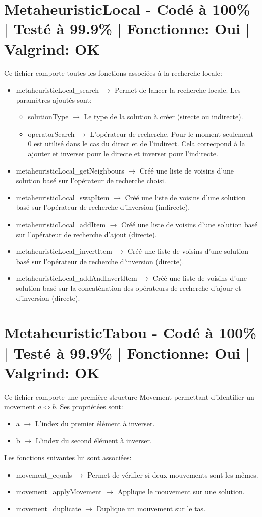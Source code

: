 \documentclass{EPUProjetPeiP}
\newcommand{\comp}[5]{
	\section[#1]{#1 {\small - Codé à #2\% $\vert$ Testé à #3\% $\vert$ Fonctionne: #4 $\vert$ Valgrind: #5}}
}
\begin{document}
\comp{MetaheuristicLocal}{100}{99.9}{Oui}{OK}
Ce fichier comporte toutes les fonctions associées à la recherche locale:
\begin{itemize}
	\item metaheuristicLocal\_search $\longrightarrow$ Permet de lancer la recherche locale. Les paramètres ajoutés sont:
	\begin{itemize}
		\item solutionType $\longrightarrow$ Le type de la solution à créer (sirecte ou indirecte).
		\item operatorSearch $\longrightarrow$ L'opérateur de recherche. Pour le moment seulement 0 est utilisé dans le cas du direct et de l'indirect. Cela correcpond à la ajouter et inverser pour le directe et inverser pour l'indirecte.
	\end{itemize}
	\item metaheuristicLocal\_getNeighbours $\longrightarrow$ Créé une liste de voisins d'une solution basé sur l'opérateur de recherche choisi.
	\item metaheuristicLocal\_swapItem $\longrightarrow$ Créé une liste de voisins d'une solution basé sur l'opérateur de recherche d'inversion (indirecte).
	\item metaheuristicLocal\_addItem $\longrightarrow$ Créé une liste de voisins d'une solution basé sur l'opérateur de recherche d'ajout (directe).
	\item metaheuristicLocal\_invertItem $\longrightarrow$ Créé une liste de voisins d'une solution basé sur l'opérateur de recherche d'inversion (directe).
	\item metaheuristicLocal\_addAndInvertItem $\longrightarrow$ Créé une liste de voisins d'une solution basé sur la concaténation des opérateurs de recherche d'ajour et d'inversion (directe).
\end{itemize}

\comp{MetaheuristicTabou}{100}{99.9}{Oui}{OK}
Ce fichier comporte une première structure Movement permettant d'identifier un movement $a\Leftrightarrow b$. Ses propriétées sont:
\begin{itemize}
	\item a $\longrightarrow$ L'index du premier élément à inverser.
	\item b $\longrightarrow$ L'index du second élément à inverser.\\
\end{itemize}

Les fonctions suivantes lui sont associées:
\begin{itemize}
	\item movement\_equals $\longrightarrow$ Permet de vérifier si deux mouvements sont les mêmes.
	\item movement\_applyMovement $\longrightarrow$ Applique le mouvement sur une solution.
	\item movement\_duplicate $\longrightarrow$ Duplique un mouvement sur le tas.\\
\end{itemize}
\end{document}
